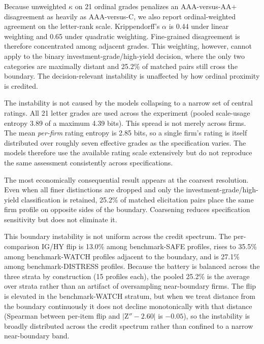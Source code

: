 \documentclass[a4paper,fleqn]{cas-sc}
\begin{document}
Because unweighted $\kappa$ on 21 ordinal grades penalizes an AAA-versus-AA$+$ disagreement as heavily
as AAA-versus-C, we also report ordinal-weighted agreement on the letter-rank scale. Krippendorff's
$\alpha$ is 0.44 under linear weighting and 0.65 under quadratic weighting. Fine-grained disagreement is
therefore concentrated among adjacent grades. This weighting, however, cannot apply to the binary
investment-grade/high-yield decision, where the only two categories are maximally distant and 25.2\% of
matched pairs still cross the boundary. The decision-relevant instability is unaffected by how ordinal
proximity is credited.

The instability is not caused by the models collapsing to a narrow set of central ratings. All 21 letter
grades are used across the experiment (pooled scale-usage entropy 3.89 of a maximum 4.39 bits). This
spread is not merely across firms. The mean \emph{per-firm} rating entropy is 2.85 bits, so a single
firm's rating is itself distributed over roughly seven effective grades as the specification varies. The
models therefore use the available rating scale extensively but do not reproduce the same assessment
consistently across specifications.

The most economically consequential result appears at the coarsest resolution. Even when all finer
distinctions are dropped and only the investment-grade/high-yield classification is retained, 25.2\% of
matched elicitation pairs place the same firm profile on opposite sides of the boundary. Coarsening
reduces specification sensitivity but does not eliminate it.

This boundary instability is not uniform across the credit spectrum. The per-comparison IG/HY flip is 13.0\% among benchmark-SAFE profiles, rises to
35.5\% among benchmark-WATCH profiles adjacent to the boundary, and is 27.1\% among benchmark-DISTRESS
profiles. Because the battery is balanced across the three strata by construction (15 profiles each), the
pooled 25.2\% is the average over strata rather than an artifact of oversampling near-boundary firms.
The flip is elevated in the benchmark-WATCH stratum, but when we treat distance from the boundary
continuously it does not decline monotonically with that distance (Spearman between per-item flip and
$|$Z$''-2.60|$ is $-0.05$), so the instability is broadly distributed across the credit spectrum rather
than confined to a narrow near-boundary band.
\end{document}
